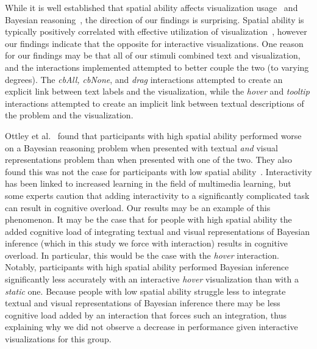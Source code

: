 While it is well established that spatial ability affects visualization usage~\cite{liu2020Survey} and Bayesian reasoning~\cite{ottley2016Bayesian}, the direction of our findings is surprising. Spatial ability is typically positively correlated with effective utilization of visualization~\cite{liu2020Survey}, however our findings indicate that the opposite for interactive visualizations. One reason for our findings may be that all of our stimuli combined text and visualization, and the interactions implemented attempted to better couple the two (to varying degrees). The \textit{cbAll, cbNone}, and \textit{drag} interactions attempted to create an explicit link between text labels and the visualization, while the \textit{hover} and \textit{tooltip} interactions attempted to create an implicit link between textual descriptions of the problem and the visualization. %

Ottley et al.~\cite{ottley2016Bayesian} found that participants with high spatial ability performed worse on a Bayesian reasoning problem when presented with textual \textit{and} visual representations problem than when presented with one of the two. They also found this was not the case for participants with low spatial ability~\cite{ottley2016Bayesian}. Interactivity has been linked to increased learning in the field of multimedia learning\cite{evans2007Interactivity}, but some experts caution that adding interactivity to a significantly complicated task can result in cognitive overload\cite{mayer2001Cognitive}. Our results may be an example of this phenomenon. It may be the case that for people with high spatial ability the added cognitive load of integrating textual and visual representations of Bayesian inference (which in this study we force with interaction) results in cognitive overload. In particular, this would be the case with the \textit{hover} interaction. Notably, participants with high spatial ability performed Bayesian inference significantly less accurately with an interactive \textit{hover} visualization than with a \textit{static} one. Because people with low spatial ability struggle less to integrate textual and visual representations of Bayesian inference there may be less cognitive load added by an interaction that forces such an integration, thus explaining why we did not observe a decrease in performance given interactive visualizations for this group.    



